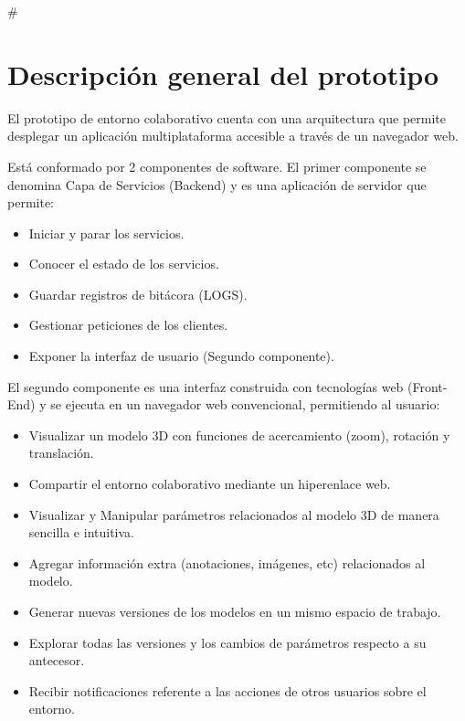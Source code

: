 #\section{Descripción general del prototipo}
El prototipo de entorno colaborativo cuenta con una arquitectura que permite desplegar un aplicación multiplataforma accesible a través de un navegador web.

Está conformado por 2 componentes de software.
El primer componente se denomina Capa de Servicios (Backend) y es una aplicación de servidor que permite:
\begin{itemize}
  \item Iniciar y parar los servicios. 
  \item Conocer el estado de los servicios.
  \item Guardar registros de bitácora (LOGS).
  \item Gestionar peticiones de los clientes.
  \item Exponer la interfaz de usuario (Segundo componente).
\end{itemize}

El segundo componente es una interfaz construida con tecnologías web (Front-End) y se ejecuta en un navegador web convencional, permitiendo al usuario:
\begin{itemize}
  \item Visualizar un modelo 3D con funciones de acercamiento (zoom), rotación y translación.
  \item Compartir el entorno colaborativo mediante un hiperenlace web.
  \item Visualizar y Manipular parámetros relacionados al modelo 3D de manera sencilla e intuitiva.
  \item Agregar información extra (anotaciones, imágenes, etc) relacionados al modelo.
  \item Generar nuevas versiones de los modelos en un mismo espacio de trabajo.
  \item Explorar todas las versiones y los cambios de parámetros respecto a su antecesor.
  \item Recibir notificaciones referente a las acciones de otros usuarios sobre el entorno.
 
\end{itemize}


